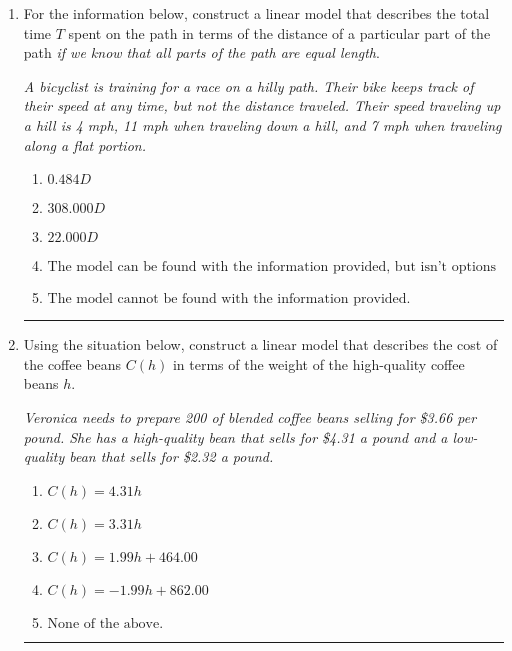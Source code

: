 \documentclass[14pt]{extbook}
\newcommand{\litem}[1]{\item#1\hspace*{-1cm}\rule{\textwidth}{0.4pt}}
\begin{document}
\begin{enumerate}
{\begin{enumerate}[label=\Alph*.]
\end{enumerate} }
\litem{
For the information below, construct a linear model that describes the total time $T$ spent on the path in terms of the distance of a particular part of the path \textit{if we know that all parts of the path are equal length}.
\begin{center}
    \textit{ A bicyclist is training for a race on a hilly path. Their bike keeps track of their speed at any time, but not the distance traveled. Their speed traveling up a hill is 4 mph, 11 mph when traveling down a hill, and 7 mph when traveling along a flat portion. }
\end{center}
\begin{enumerate}[label=\Alph*.]
\item \( 0.484 D \)
\item \( 308.000 D \)
\item \( 22.000 D \)
\item \( \text{The model can be found with the information provided, but isn't options 1-3.} \)
\item \( \text{The model cannot be found with the information provided.} \)

\end{enumerate} }
\litem{
Using the situation below, construct a linear model that describes the cost of the coffee beans $C(h)$ in terms of the weight of the high-quality coffee beans $h$.
\begin{center}
    \textit{ Veronica needs to prepare 200 of blended coffee beans selling for \$3.66 per pound. She has a high-quality bean that sells for \$4.31 a pound and a low-quality bean that sells for \$2.32 a pound. }
\end{center}
\begin{enumerate}[label=\Alph*.]
\item \( C(h) = 4.31 h \)
\item \( C(h) = 3.31 h \)
\item \( C(h) = 1.99 h + 464.00 \)
\item \( C(h) = -1.99 h + 862.00 \)
\item \( \text{None of the above.} \)

\end{enumerate} }
\end{enumerate}
\end{document}
